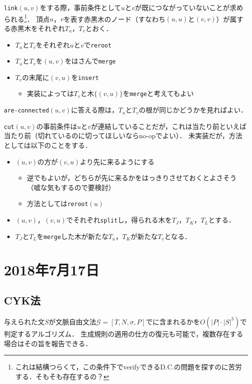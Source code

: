 \documentclass[a4paper]{jsarticle}
\begin{document}
\texttt{link}$(u, v)$をする際，事前条件として$u$と$v$が既につながっていないことが求められる\footnote{これは結構つらくて，この条件下でverifyできるD.C.の問題を探すのに苦労する．そもそも存在するの？}．
頂点$u$，$v$を表す赤黒木のノード（すなわち$(u, u)$と$(v, v)$）が属する赤黒木をそれぞれ$T_u$，$T_v$とおく．
\begin{itemize}
\item $T_u$と$T_v$をそれぞれ$u$と$v$で\texttt{reroot}
\item $T_u$と$T_v$を$(u, v)$をはさんで\texttt{merge}
\item $T_v$の末尾に$(v, u)$を\texttt{insert}
  \begin{itemize}
  \item 実装によっては$T_v$と木$\{(v, u)\}$を\texttt{merge}と考えてもよい
  \end{itemize}
\end{itemize}

\texttt{are-connected}$(u, v)$に答える際は，$T_u$と$T_v$の根が同じかどうかを見ればよい．

\texttt{cut}$(u, v)$の事前条件は$u$と$v$が連結していることだが，これは当たり前といえば当たり前（切れているのに切ってほしいならno-opでよい）．
未実装だが，方法としては以下のことをする．
\begin{itemize}
\item $(u, v)$の方が$(v, u)$より先に来るようにする
  \begin{itemize}
  \item 逆でもよいが，どちらが先に来るかをはっきりさせておくとよさそう（嘘な気もするので要検討）
  \item 方法としては\texttt{reroot}$(u)$
  \end{itemize}
\item $(u, v)$，$(v, u)$でそれぞれ\texttt{split}し，得られる木を$T_J$，$T_K$，$T_L$とする．
\item $T_J$と$T_L$を\texttt{merge}した木が新たな$T_u$，$T_K$が新たな$T_v$となる．
\end{itemize}
\section{2018年7月17日}
\subsection{CYK法}

与えられた文$S$が文脈自由文法$\mathscr{G}=[T, N, \sigma, P]$でに含まれるかを$O(|P|\cdot|S|^3)$で判定するアルゴリズム．
生成規則の適用の仕方の復元も可能で，複数存在する場合はその旨を報告できる．
\end{document}
